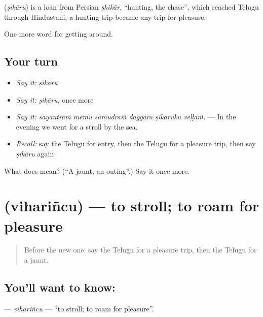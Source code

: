 \begin{cousinweb}
\textbf{} (\emph{ṣikāru}) is a loan from Persian \emph{shikār}, \textquotedblleft{}hunting, the chase\textquotedblright{}, which reached Telugu through Hindustani; a hunting trip became any trip for pleasure.
\end{cousinweb}

\begin{grammarlens}[title={What you've built}]
One more word for getting around.
\end{grammarlens}

\subsection*{Your turn}
\begin{itemize}
\raggedright
  \item \emph{Say it:} \emph{ṣikāru}
  \item \emph{Say it:} \emph{ṣikāru}, once more
  \item \emph{Say it:} \emph{sāyantraṁ mēmu samudraṁ daggara ṣikāruku veḷḷāṁ.} — In the evening we went for a stroll by the sea.
  \item \emph{Recall:} say the Telugu for entry, then the Telugu for a pleasure trip, then say \emph{ṣikāru} again
\end{itemize}

\begin{tcolorbox}[breakable,colback=teal!4,colframe=teal!35!black,title={Before you move on}]
What does  mean? (\textquotedblleft{}A jaunt; an outing\textquotedblright{}.) Say it once more.
\end{tcolorbox}
\section[\texorpdfstring{\te{విహరించు} (vihariñcu)}{విహరించు (vihariñcu)}]{ (vihariñcu) — to stroll; to roam for pleasure}

\label{lesson:TE-C456-viharincu}



\begin{quote}
Before the new one: say the Telugu for a pleasure trip, then the Telugu for a jaunt.
\end{quote}

\subsection*{You'll want to know: }
\textbf{} — \emph{vihariñcu} — \textquotedblleft{}to stroll; to roam for pleasure\textquotedblright{}.

